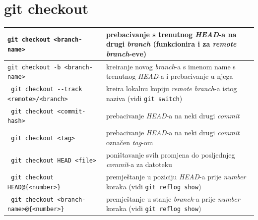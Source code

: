 \documentclass[10pt]{article}
\begin{document}
    \section*{\color{BrickRed} git checkout}
    \begin{tabular}{|>{\tt}p{9.25cm}|>{}p{15.50cm}|}
        \hline
        git checkout <branch-name>                      & prebacivanje s trenutnog \textit{HEAD}-a na drugi \textit{branch} (funkcionira i za \textit{remote branch}-eve) \\ \hline
        git checkout -b <branch-name>                   & kreiranje novog \textit{branch}-a s imenom name s trenutnog \textit{HEAD}-a i prebacivanje u njega \\ \hline
        git checkout -{}-track <remote>/<branch>        & kreira lokalnu kopiju \textit{remote branch}-a istog naziva (vidi \texttt{git switch}) \\ \hline
        git checkout <commit-hash>                      & prebacivanje \textit{HEAD}-a na neki drugi \textit{commit} \\ \hline
        git checkout <tag>                              & prebacivanje \textit{HEAD}-a na neki drugi \textit{commit} označen \textit{tag}-om \\ \hline
        git checkout HEAD <file>                        & poništavanje svih promjena do posljednjeg \textit{commit}-a za datoteku \\ \hline
        git checkout HEAD@\{<number>\}                  & premještanje u poziciju \textit{HEAD}-a prije \textit{number} koraka (vidi \texttt{git reflog show}) \\ \hline
        git checkout <branch-name>@\{<number>\}         & premještanje u stanje \textit{branch}-a prije \textit{number} koraka (vidi \texttt{git reflog show}) \\ \hline
    \end{tabular}
\end{document}
